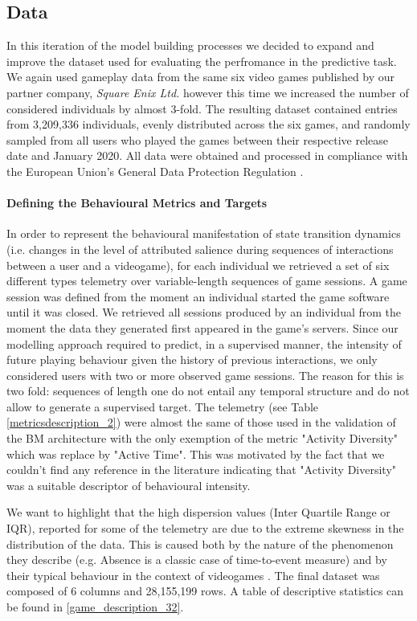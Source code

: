 \subsection{Data}
\label{data_2}
In this iteration of the model building processes we decided to expand and improve the dataset used for evaluating the perfromance in the predictive task. We again used gameplay data from the same six video games published by our partner company, \textit{Square Enix Ltd.} however this time we increased the number of considered individuals by almost 3-fold. The resulting dataset contained entries from 3,209,336 individuals, evenly distributed across the six games, and randomly sampled from all users who played the games between their respective release date and January 2020. All data were obtained and processed in compliance with the European Union's General Data Protection Regulation \cite{EUdataregulations2018}. 
\paragraph*{Defining the Behavioural Metrics and Targets}
In order to represent the behavioural manifestation of state transition dynamics (i.e. changes in the level of attributed salience during sequences of interactions between a user and a videogame), for each individual we retrieved a set of six different types telemetry over variable-length sequences of game sessions. A game session was defined from the moment an individual started the game software until it was closed. We retrieved all sessions produced by an individual from the moment the data they generated first appeared in the game's servers. Since our modelling approach required to predict, in a supervised manner, the intensity of future playing behaviour given the history of previous interactions, we only considered users with two or more observed game sessions. The reason for this is two fold: sequences of length one do not entail any temporal structure and do not allow to generate a supervised target. The telemetry (see Table \ref{metricsdescription_2}) were almost the same of those used in the validation of the BM architecture with the only exemption of the metric "Activity Diversity" which was replace by "Active Time". This was motivated by the fact that we couldn't find any reference in the literature indicating that "Activity Diversity" was a suitable descriptor of behavioural intensity. 

We want to highlight that the high dispersion values (Inter Quartile Range  or IQR), reported for some of the telemetry are due to the extreme skewness in the distribution of the data. This is caused both by the nature of the phenomenon they describe (e.g. Absence is a classic case of time-to-event measure) and by their typical behaviour in the context of videogames \cite{bauckhage2012players}. The final dataset was composed of 6 columns and 28,155,199 rows. A table of descriptive statistics can be found in \ref{game_description_32}.

